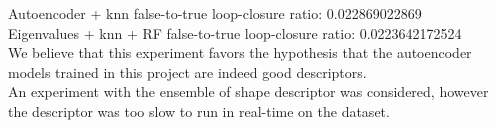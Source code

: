Autoencoder + knn false-to-true loop-closure ratio: 0.022869022869\\
Eigenvalues + knn + RF false-to-true loop-closure ratio: 0.0223642172524\\

We believe that this experiment favors the hypothesis that the autoencoder models trained in this project are indeed good descriptors.\\

An experiment with the ensemble of shape descriptor was considered, however the descriptor was too slow to run in real-time on the dataset.\\


